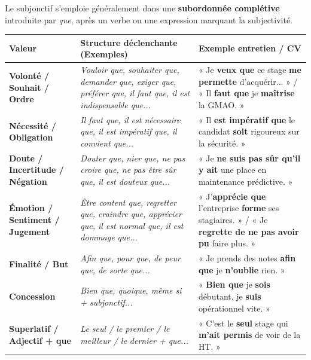 \documentclass[11pt]{article}
\begin{document}
\begin{propriete}
Le subjonctif s'emploie généralement dans une \textbf{subordonnée complétive} introduite par \emph{que}, après un verbe ou une expression marquant la subjectivité.
\begin{center}
\begin{tabularx}{\linewidth}{|l|X|l|}\hline
\rowcolor{popblueL}
\textbf{Valeur} & \textbf{Structure déclenchante (Exemples)} & \textbf{Exemple entretien / CV} \\ \hline
\textbf{Volonté / Souhait / Ordre} & \emph{Vouloir que, souhaiter que, demander que, exiger que, préférer que, il faut que, il est indispensable que...} & « Je \textbf{veux que} ce stage \textbf{me permette} d'acquérir... » / « Il \textbf{faut que} je \textbf{maîtrise} la GMAO. » \\ \hline
\textbf{Nécessité / Obligation} & \emph{Il faut que, il est nécessaire que, il est impératif que, il convient que...} & « Il \textbf{est impératif que} le candidat \textbf{soit} rigoureux sur la sécurité. » \\ \hline
\textbf{Doute / Incertitude / Négation} & \emph{Douter que, nier que, ne pas croire que, ne pas être sûr que, il est douteux que...} & « Je \textbf{ne suis pas sûr qu'il} \textbf{y ait} une place en maintenance prédictive. » \\ \hline
\textbf{Émotion / Sentiment / Jugement} & \emph{Être content que, regretter que, craindre que, apprécier que, il est normal que, il est dommage que...} & « J'\textbf{apprécie que} l'entreprise \textbf{forme} ses stagiaires. » / « Je \textbf{regrette de ne pas avoir} \textbf{pu} faire plus. » \\ \hline
\textbf{Finalité / But} & \emph{Afin que, pour que, de peur que, de sorte que...} & « Je prends des notes \textbf{afin que} je \textbf{n'oublie} rien. » \\ \hline
\textbf{Concession} & \emph{Bien que, quoique, même si + subjonctif...} & « \textbf{Bien que} je \textbf{sois} débutant, je \textbf{suis} opérationnel vite. » \\ \hline
\textbf{Superlatif / Adjectif + que} & \emph{Le seul / le premier / le meilleur / le dernier + que...} & « C'est le \textbf{seul} stage qui \textbf{m'ait permis} de voir de la HT. » \\ \hline
\end{tabularx}
\end{center}
\end{propriete}
\end{document}
